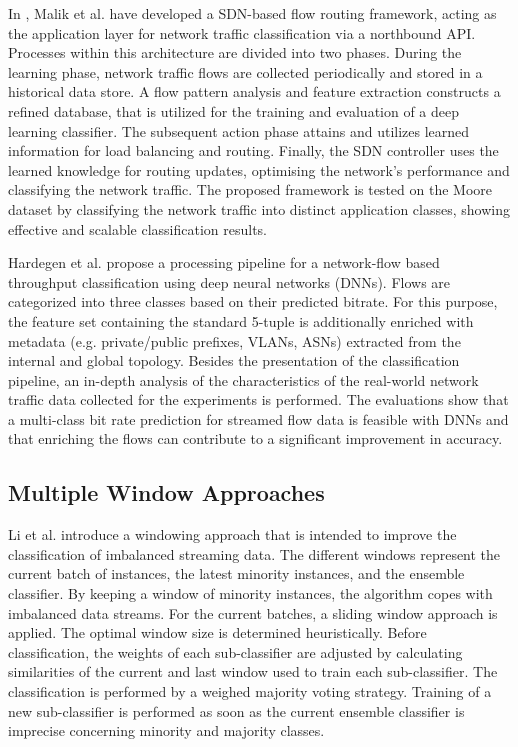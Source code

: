 \documentclass[conference]{IEEEtran}
\begin{document}
In \cite{malik_intelligent_2020}, Malik et al. have developed a SDN-based flow routing framework, acting as the application layer for network traffic classification via a northbound API. Processes within this architecture are divided into two phases. During the learning phase, network traffic flows are collected periodically and stored in a historical data store. A flow pattern analysis and feature extraction constructs a refined database, that is utilized for the training and evaluation of a deep learning classifier. The subsequent action phase attains and utilizes learned information for load balancing and routing. Finally, the SDN controller uses the learned knowledge for routing updates, optimising the network's performance and classifying the network traffic. The proposed framework is tested on the Moore dataset by classifying the network traffic into distinct application classes, showing effective and scalable classification results.

Hardegen et al. \cite{hardegen_flow-based_2019} propose a processing pipeline for a network-flow based throughput classification using deep neural networks (DNNs). Flows are categorized into three classes based on their predicted bitrate. For this purpose, the feature set containing the standard 5-tuple is additionally enriched with metadata (e.g. private/public prefixes, VLANs, ASNs) extracted from the internal and global topology. Besides the presentation of the classification pipeline, an in-depth analysis of the characteristics of the real-world network traffic data collected for the experiments is performed. The evaluations show that a multi-class bit rate prediction for streamed flow data is feasible with DNNs and that enriching the flows can contribute to a significant improvement in accuracy. 



\subsection{Multiple Window Approaches}
Li et al. \cite{li_multi-window_2017} introduce a windowing approach that is intended to improve the classification of imbalanced streaming data. The different windows represent the current batch of instances, the latest minority instances, and the ensemble classifier. By keeping a window of minority instances, the algorithm copes with imbalanced data streams. For the current batches, a sliding window approach is applied. The optimal window size is determined heuristically. Before classification, the weights of each sub-classifier are adjusted by calculating similarities of the current and last window used to train each sub-classifier. The classification is performed by a weighed majority voting strategy. Training of a new sub-classifier is performed as soon as the current ensemble classifier is imprecise concerning minority and majority classes.
\end{document}
